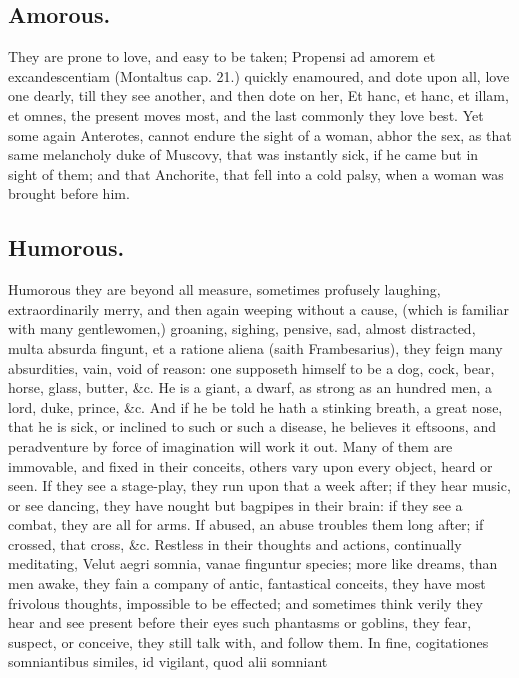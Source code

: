 {\subsection{Amorous.}
They are prone to love, and easy to be taken;
Propensi ad amorem et excandescentiam (Montaltus cap. 21.) quickly
enamoured, and dote upon all, love one dearly, till they see another,
and then dote on her, Et hanc, et hanc, et illam, et omnes, the present
moves most, and the last commonly they love best. Yet some again
Anterotes, cannot endure the sight of a woman, abhor the sex, as that
same melancholy duke of Muscovy, that was instantly sick, if he
came but in sight of them; and that Anchorite, that fell into a
cold palsy, when a woman was brought before him.

\subsection{Humorous.}
Humorous they are beyond all measure, sometimes profusely
laughing, extraordinarily merry, and then again weeping without a
cause, (which is familiar with many gentlewomen,) groaning, sighing,
pensive, sad, almost distracted, multa absurda fingunt, et a ratione
aliena (saith Frambesarius), they feign many absurdities, vain,
void of reason: one supposeth himself to be a dog, cock, bear, horse,
glass, butter, \&c. He is a giant, a dwarf, as strong as an hundred men,
a lord, duke, prince, \&c. And if he be told he hath a stinking breath,
a great nose, that he is sick, or inclined to such or such a disease,
he believes it eftsoons, and peradventure by force of imagination will
work it out. Many of them are immovable, and fixed in their conceits,
others vary upon every object, heard or seen. If they see a stage-play,
they run upon that a week after; if they hear music, or see dancing,
they have nought but bagpipes in their brain: if they see a combat,
they are all for arms. If abused, an abuse troubles them long
after; if crossed, that cross, \&c. Restless in their thoughts and
actions, continually meditating, Velut aegri somnia, vanae finguntur
species; more like dreams, than men awake, they fain a company of
antic, fantastical conceits, they have most frivolous thoughts,
impossible to be effected; and sometimes think verily they hear and see
present before their eyes such phantasms or goblins, they fear,
suspect, or conceive, they still talk with, and follow them. In fine,
cogitationes somniantibus similes, id vigilant, quod alii somniant
}
